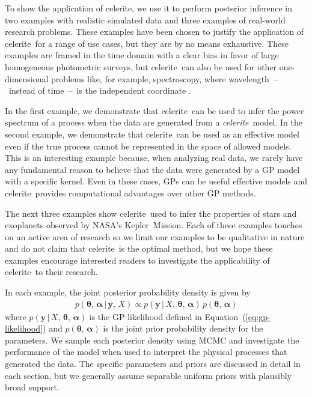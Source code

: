 \documentclass[manuscript, letterpaper]{aastex6}
\newcommand{\project}[1]{\textsf{#1}}
\newcommand{\kepler}{\project{Kepler}}
\newcommand{\celerite}{\project{celerite}}
\newcommand{\celeriteterm}{\emph{celerite}}
\renewcommand{\eqref}[1]{\ref{eq:#1}}
\newcommand{\Eq}[1]{Equation~(\eqref{#1})}
\newcommand{\eq}[1]{\Eq{#1}}
\newcommand{\eqlabel}[1]{\label{eq:#1}}
\newcommand{\bvec}[1]{{\ensuremath{\boldsymbol{#1}}}}
\newcommand{\response}[1]{{\color{blue}#1}}
\begin{document}
\response{
To show the application of \celerite, we use it to perform posterior
inference in two examples with realistic simulated data and three examples of
real-world research problems.
These examples have been chosen to justify the application of \celerite\ for a
range of use cases, but they are by no means exhaustive.
These examples are framed in the time domain with a clear bias in favor of
large homogeneous photometric surveys, but \celerite\ can also be used for
other one-dimensional problems like, for example, spectroscopy, where
wavelength~--~instead of time~--~is the independent coordinate \citep[see][for
a potential application]{Czekala:2017}.

In the first example, we demonstrate that \celerite\ can be used to infer
the power spectrum of a process when the data are generated from a
\celeriteterm\ model.
In the second example, we demonstrate that \celerite\ can be used as an
effective model even if the true process cannot be represented in the space of
allowed models.
This is an interesting example because, when analyzing real data, we rarely
have any fundamental reason to believe that the data were generated by a GP
model with a specific kernel.
Even in these cases, GPs can be useful effective models and \celerite\
provides computational advantages over other GP methods.

The next three examples show \celerite\ used to infer the properties of stars
and exoplanets observed by NASA's \kepler\ Mission.
Each of these examples touches on an active area of research so we limit our
examples to be qualitative in nature and do not claim that \celerite\ is the
optimal method, but we hope these examples encourage interested readers to
investigate the applicability of \celerite\ to their research.

In each example, the joint posterior probability density is given by
\begin{eqnarray}\eqlabel{joint-post}
p(\bvec{\theta},\,\bvec{\alpha}\,|\,\bvec{y},\,X) \propto
p(\bvec{y}\,|\,{X,\,\bvec{\theta}},\,\bvec{\alpha})\,
p(\bvec{\theta},\,\bvec{\alpha})
\end{eqnarray}
where $p(\bvec{y}\,|\,{X,\,\bvec{\theta}},\,\bvec{\alpha})$ is the GP
likelihood defined in \eq{gp-likelihood} and $p(\bvec{\theta},\,\bvec{\alpha})$
is the joint prior probability density for the parameters.
We sample each posterior density using MCMC and investigate the performance of
the model when used to interpret the physical processes that generated the
data.
The specific parameters and priors are discussed in detail in each section,
but we generally assume separable uniform priors with plausibly broad support.
}
\end{document}
